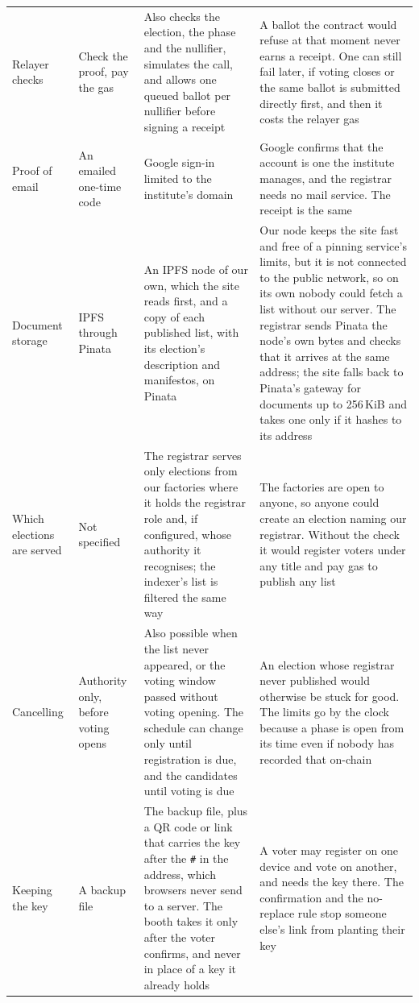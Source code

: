 \begin{longtable}{@{}>{\RaggedRight\arraybackslash\small}p{2.4cm}>{\RaggedRight\arraybackslash\small}p{3.5cm}>{\RaggedRight\arraybackslash\small}p{4.8cm}>{\RaggedRight\arraybackslash\small}p{6.4cm}@{}}
  \addlinespace[3pt]
  Relayer checks & Check the proof, pay the gas & Also checks the election, the phase and the nullifier, simulates the call, and allows one queued ballot per nullifier before signing a receipt & A ballot the contract would refuse at that moment never earns a receipt. One can still fail later, if voting closes or the same ballot is submitted directly first, and then it costs the relayer gas \\
  \addlinespace[3pt]
  Proof of email & An emailed one-time code & Google sign-in limited to the institute's domain & Google confirms that the account is one the institute manages, and the registrar needs no mail service. The receipt is the same \\
  \addlinespace[3pt]
  Document storage & IPFS through Pinata~\cite{pinata} & An IPFS node of our own, which the site reads first, and a copy of each published list, with its election's description and manifestos, on Pinata & Our node keeps the site fast and free of a pinning service's limits, but it is not connected to the public network, so on its own nobody could fetch a list without our server. The registrar sends Pinata the node's own bytes and checks that it arrives at the same address; the site falls back to Pinata's gateway for documents up to 256\,KiB and takes one only if it hashes to its address \\
  \addlinespace[3pt]
  Which elections are served & Not specified & The registrar serves only elections from our factories where it holds the registrar role and, if configured, whose authority it recognises; the indexer's list is filtered the same way & The factories are open to anyone, so anyone could create an election naming our registrar. Without the check it would register voters under any title and pay gas to publish any list \\
  \addlinespace[3pt]
  Cancelling & Authority only, before voting opens & Also possible when the list never appeared, or the voting window passed without voting opening. The schedule can change only until registration is due, and the candidates until voting is due & An election whose registrar never published would otherwise be stuck for good. The limits go by the clock because a phase is open from its time even if nobody has recorded that on-chain \\
  \addlinespace[3pt]
  Keeping the key & A backup file & The backup file, plus a QR code or link that carries the key after the \texttt{\#} in the address, which browsers never send to a server. The booth takes it only after the voter confirms, and never in place of a key it already holds & A voter may register on one device and vote on another, and needs the key there. The confirmation and the no-replace rule stop someone else's link from planting their key \\
\end{longtable}

